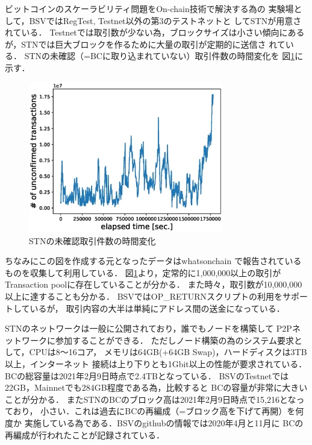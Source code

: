 \documentclass[graybox]{svmult}
\begin{document}
ビットコインのスケーラビリティ問題をOn-chain技術で解決する為の
実験場として，BSVではRegTest, Testnet以外の第3のテストネットと
してSTNが用意されている．
Testnetでは取引数が少ない為，ブロックサイズは小さい傾向にある
が，STNでは巨大ブロックを作るために大量の取引が定期的に送信さ
れている．
STNの未確認（=BCに取り込まれていない）取引件数の時間変化を
図\ref{fig:unconfirmed_tx}に示す．
%
\begin{figure}[t]
  \vspace{-45mm}
  \begin{center}
    \includegraphics[width=85mm]{time_vs_tx-plot.eps}
  \end{center}
  \vspace{45mm}
  \caption{STNの未確認取引件数の時間変化}
  \label{fig:unconfirmed_tx}
\end{figure}
%




ちなみにこの図を作成する元となったデータはwhatsonchain \cite{woc} 
で報告されているものを収集して利用している．
図\ref{fig:unconfirmed_tx}より，定常的に1,000,000以上の取引が
Transaction poolに存在していることが分かる．
また時々，取引数が10,000,000以上に達することも分かる．
BSVではOP\_RETURNスクリプトの利用をサポートしているが，
取引内容の大半は単純にアドレス間の送金になっている．

STNのネットワークは一般に公開されており，誰でもノードを構築して
P2Pネットワークに参加することができる．
ただしノード構築の為のシステム要求として，CPUは8〜16コア，
メモリは64GB(+64GB Swap)，ハードディスクは3TB以上，インターネット
接続は上り下りとも1Gbit以上の性能が要求されている．
BCの総容量は2021年2月9日時点で2.4TBとなっている．
BSVのTestnetでは22GB，Mainnetでも284GB程度である為，比較すると
BCの容量が非常に大きいことが分かる．
またSTNのBCのブロック高は2021年2月9日時点で15,216となっており，
小さい．これは過去にBCの再編成（=ブロック高を下げて再開）を何度か
実施している為である．BSVのgithubの情報では2020年4月と11月に
BCの再編成が行われたことが記録されている．
\end{document}
